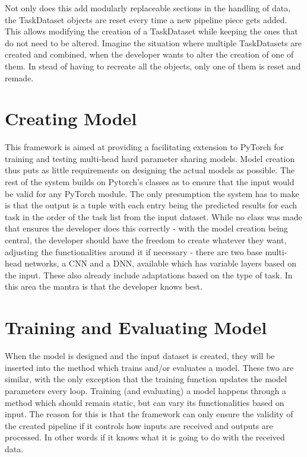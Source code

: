 Not only does this add modularly replaceable sections in the handling of data, the TaskDataset objects are reset every time a new pipeline piece gets added. This allows modifying the creation of a TaskDataset while keeping the ones that do not need to be altered. Imagine the situation where multiple TaskDatasets are created and combined, when the developer wants to alter the creation of one of them. In stead of having to recreate all the objects, only one of them is reset and remade. \\


\section{Creating Model} \label{Design:Model}

This framework is aimed at providing a facilitating extension to PyTorch for training and testing multi-head hard parameter sharing models. Model creation thus puts as little requirements on designing the actual models as possible. The rest of the system builds on Pytorch's classes as to ensure that the input would be valid for any PyTorch module. The only presumption the system has to make is that the output is a tuple with each entry being the predicted results for each task in the order of the task list from the input dataset. While no class was made that ensures the developer does this correctly - with the model creation being central, the developer should have the freedom to create whatever they want, adjusting the functionalities around it if necessary - there are two base multi-head networks, a CNN and a DNN, available which has variable layers based on the input. These also already include adaptations based on the type of task. In this area the mantra is that the developer knows best. \\


\section{Training and Evaluating Model} \label{Design:Training}

When the model is designed and the input dataset is created, they will be inserted into the method which trains and/or evaluates a model. These two are similar, with the only exception that the training function updates the model parameters every loop. Training (and evaluating) a model happens through a method which should remain static, but can vary its functionalities based on input. The reason for this is that the framework can only ensure the validity of the created pipeline if it controls how inputs are received and outputs are processed. In other words if it knows what it is going to do with the received data. \\

